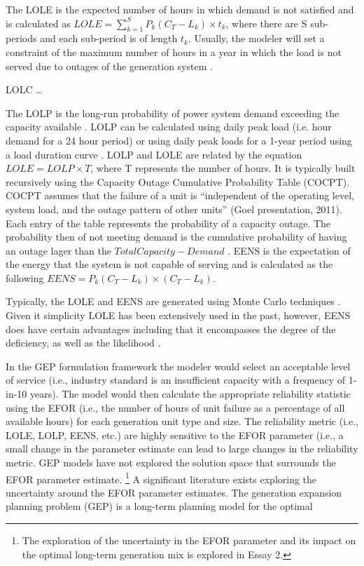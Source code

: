 \documentclass[10pt]{amsart}
\begin{document}
The LOLE is the expected number of hours in which demand is not satisfied and is calculated as $LOLE = \sum_{k=1}^S P_k\left(C_T - L_k \right)\times t_k$, where there are S sub-periods and each sub-period is of length $t_k$.
Usually, the modeler will set a constraint of the maximum number of hours in a year in which the load is not served due to outages of the generation system \parencite{phoon:2006}.

LOLC \ldots

The LOLP is the long-run probability of power system demand exceeding the capacity available \parencite{endrenyi:1978}.  
LOLP can be calculated using daily peak load (i.e. hour demand for a 24 hour period) or using daily peak loads for a 1-year period using a load duration curve \parencite{endrenyi:1978}.
LOLP and LOLE are related by the equation $LOLE = LOLP \times T$, where T represents the number of hours.   
It is typically built recursively using the Capacity Outage Cumulative Probability Table (COCPT). 
COCPT assumes that the failure of a unit is ``independent of the operating level, system load, and the outage pattern of other units'' (Goel presentation, 2011). 
Each entry of the table represents the probability of a capacity outage.
The probability then of not meeting demand is the cumulative probability of having an outage lager than the $Total Capacity - Demand$ \parencite[p78]{pereira2010decision}.
EENS is the expectation of the energy that the system is not capable of serving and is calculated as the following $EENS = P_k \left(C_T - L_k \right)\times \left(C_T- L_k \right)$. 

Typically, the LOLE and EENS are generated using Monte Carlo techniques \parencite{billinton1996reliability, li2012uncertainty}.
	Given it simplicity LOLE has been extensively used in the past, however, EENS does have certain advantages including that it encompasses the degree of the deficiency, as well as the likelihood \parencite[p622]{murugan2009nsga}. 
	
	In the GEP formulation framework the modeler would select an acceptable level of service (i.e., industry standard is an insufficient capacity with a frequency of 1-in-10 years)\parencite{}. 
	The model would then calculate the appropriate reliability statistic using the EFOR (i.e., the number of hours of unit failure as a percentage of all available hours) for each generation unit type and size.
	The reliability metric (i.e., LOLE, LOLP, EENS, etc.) are highly sensitive to the EFOR parameter (i.e., a small change in the parameter estimate can lead to large changes in the reliability metric. 
	GEP models have not explored the solution space that surrounds the EFOR parameter estimate. \footnote{The exploration of the uncertainty in the EFOR parameter and its impact on the optimal long-term generation mix is explored in Essay 2.}
	A significant literature exists exploring the uncertainty around the EFOR parameter estimates.
The generation expansion planning problem (GEP) is a long-term planning model for the optimal 
\end{document}
